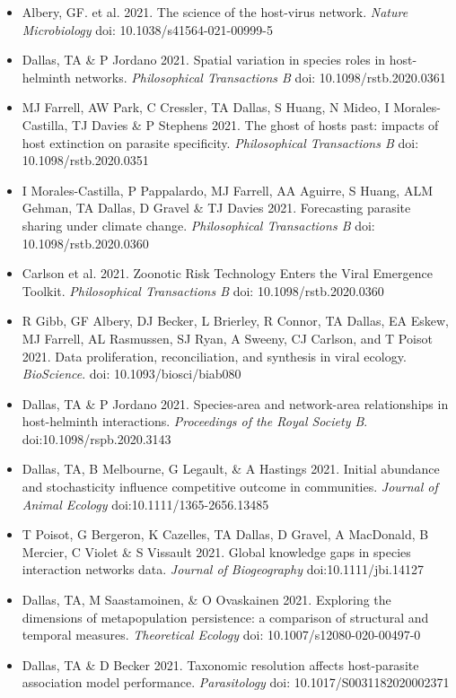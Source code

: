 \documentclass[]{CV}
\begin{document}
\begin{itemize}

\item Albery, GF. et al. 2021. The science of the host-virus network. \textit{Nature Microbiology} doi: 10.1038/s41564-021-00999-5

\item {\mefont Dallas, TA} \& P Jordano 2021. Spatial variation in species roles in host-helminth networks. \textit{Philosophical Transactions B} doi: 10.1098/rstb.2020.0361

\item MJ Farrell, AW Park, C Cressler, {\mefont TA Dallas}, S Huang, N Mideo, I Morales-Castilla, TJ Davies \& P Stephens 2021. The ghost of hosts past: impacts of host extinction on parasite specificity. \textit{Philosophical Transactions B} doi: 10.1098/rstb.2020.0351

\item I Morales-Castilla, P Pappalardo, MJ Farrell, AA Aguirre, S Huang, ALM Gehman, {\mefont TA Dallas}, D Gravel \& TJ Davies 2021. Forecasting parasite sharing under climate change. \textit{Philosophical Transactions B} doi: 10.1098/rstb.2020.0360

\item Carlson et al. 2021. Zoonotic Risk Technology Enters the Viral Emergence Toolkit. \textit{Philosophical Transactions B} doi: 10.1098/rstb.2020.0360

\item R Gibb, GF Albery, DJ Becker, L Brierley, R Connor, {\mefont TA Dallas}, EA Eskew, MJ Farrell, AL Rasmussen, SJ Ryan, A Sweeny, CJ Carlson, and T Poisot 2021. Data proliferation, reconciliation, and synthesis in viral ecology. \textit{BioScience}. doi: 10.1093/biosci/biab080

\item {\mefont Dallas, TA} \& P Jordano 2021. Species-area and network-area relationships in host-helminth interactions. \textit{Proceedings of the Royal Society B}. doi:10.1098/rspb.2020.3143

\item {\mefont Dallas, TA}, B Melbourne, G Legault, \& A Hastings 2021. Initial abundance and stochasticity influence competitive outcome in communities. \textit{Journal of Animal Ecology} doi:10.1111/1365-2656.13485

\item T Poisot, G Bergeron, K Cazelles, {\mefont TA Dallas}, D Gravel, A MacDonald, B Mercier, C Violet \& S Vissault 2021. Global knowledge gaps in species interaction networks data. \textit{Journal of Biogeography} doi:10.1111/jbi.14127

\item {\mefont Dallas, TA}, M Saastamoinen, \& O Ovaskainen 2021. Exploring the dimensions of metapopulation persistence: a comparison of structural and temporal measures. \textit{Theoretical Ecology} doi: 10.1007/s12080-020-00497-0 

\item {\mefont Dallas, TA} \& D Becker 2021. Taxonomic resolution affects host-parasite association model performance. \textit{Parasitology} doi: 10.1017/S0031182020002371
\end{itemize}
\end{document}
